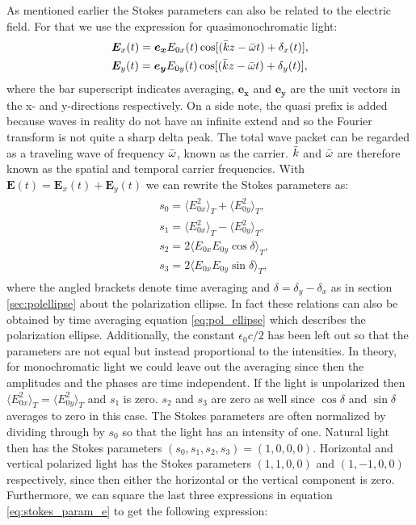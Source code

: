As mentioned earlier the Stokes parameters can also be related to the electric field. For that we use the expression for quasimonochromatic light:
\begin{align}
\begin{split}
    \label{eq:quasi_mono_efields}
    &\bm{E}_x(t) = \bm{e_x}E_{0x}(t)\cos [(\Bar{k}z-\Bar{\omega} t) + \delta_x(t)], \\
    &\bm{E}_y(t) = \bm{e_y}E_{0y}(t)\cos [(\Bar{k}z-\Bar{\omega} t) + \delta_y(t)],
\end{split}
\end{align}
where the bar superscript indicates averaging, $\bm{e_x}$ and $\bm{e_y}$ are the unit vectors in the x- and y-directions respectively. On a side note, the quasi prefix is added because waves in reality do not have an infinite extend and so the Fourier transform is not quite a sharp delta peak. The total wave packet can be regarded as a traveling wave of frequency $\Bar{\omega}$, known as the carrier. $\Bar{k}$ and $\Bar{\omega}$ are therefore known as the spatial and temporal carrier frequencies. 
With $\bm{E}(t)=\bm{E}_x(t)+\bm{E}_y(t)$ we can rewrite the Stokes parameters as:
\begin{align}
\begin{split}
    \label{eq:stokes_param_e}
    &s_0 = \langle E_{0x}^2 \rangle_T + \langle E_{0y}^2 \rangle_T, \\
    &s_1 = \langle E_{0x}^2 \rangle_T - \langle E_{0y}^2 \rangle_T, \\
    &s_2 = 2\langle E_{0x}E_{0y}\cos \delta \rangle_T, \\
    &s_3 = 2\langle E_{0x}E_{0y}\sin \delta \rangle_T,
\end{split}
\end{align}
where the angled brackets denote time averaging and $\delta=\delta_y-\delta_x$ as in section \ref{sec:polellipse} about the polarization ellipse. In fact these relations can also be obtained by time averaging equation \ref{eq:pol_ellipse} which describes the polarization ellipse. Additionally, the constant $\epsilon_0 c / 2$ has been left out so that the parameters are not equal but instead proportional to the intensities. In theory, for monochromatic light we could leave out the averaging since then the amplitudes and the phases are time independent. If the light is unpolarized then $\langle E_{0x}^2 \rangle_T = \langle E_{0y}^2 \rangle_T$ and $s_1$ is zero. $s_2$ and $s_3$ are zero as well since $\cos \delta$ and $\sin \delta$ averages to zero in this case. The Stokes parameters are often normalized by dividing through by $s_0$ so that the light has an intensity of one. Natural light then has the Stokes parameters $(s_0,s_1,s_2,s_3)=(1,0,0,0)$. Horizontal and vertical polarized light has the Stokes parameters $(1,1,0,0)$ and $(1,-1,0,0)$ respectively, since then either the horizontal or the vertical component is zero. Furthermore, we can square the last three expressions in equation \ref{eq:stokes_param_e} to get the following expression:
